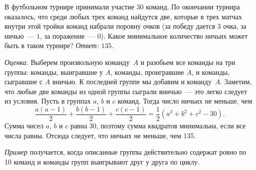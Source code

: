\problem
В футбольном турнире принимали участие $30$ команд.
По окончании турнира оказалось, что среди любых трех команд найдутся две,
которые в трех матчах внутри этой тройки команд набрали поровну очков
(за победу дается $3$ очка, за ничью~--- $1$, за поражение~--- $0$).
Какое минимальное количество ничьих может быть в таком турнире?
\solution
\emph{Ответ:} $135$.
\par
\emph{Оценка.}
Выберем произвольную команду~$A$ и разобьем все команды на три группы:
команды, выигравшие у $A$, команды, проигравшие $A$, и команды, сыгравшие
с $A$ вничью.
К последней группе мы добавим и команду~$A$.
Заметим, что любые две команды из одной группы сыграли вничью~--- это легко
следует из условия.
Пусть в группах $a$, $b$ и $c$ команд.
Тогда число ничьих не меньше, чем
\[
    \dfrac{a (a - 1)}{2} +
    \dfrac{b (b - 1)}{2} +
    \dfrac{c (c - 1)}{2}
=
    \dfrac{1}{2}(a^2 + b^2 + c^2 - 30)
.\]
Сумма чисел $a$, $b$ и $c$ равна 30, поэтому сумма квадратов минимальна, если
все числа равны.
Отсюда следует, что ничьих не меньше, чем 135.
\par
\emph{Пример} получается, когда описанные группы действительно содержат
ровно по 10 команд и команды групп выигрывают друг у друга по циклу.
\endproblem
